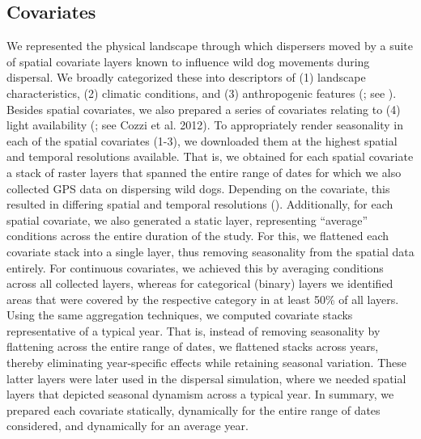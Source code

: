 \documentclass[abstract=on,10pt,a4paper,bibliography=totocnumbered]{article}
\begin{document}
\subsection{Covariates}

We represented the physical landscape through which dispersers moved by a suite
of spatial covariate layers known to influence wild dog movements during
dispersal. We broadly categorized these into descriptors of (1) landscape
characteristics, (2) climatic conditions, and (3) anthropogenic features
(; see \citealp{Hofmann.2021, Hofmann.2023}). Besides
spatial covariates, we also prepared a series of covariates relating to (4)
light availability (; see Cozzi et al. 2012). To
appropriately render seasonality in each of the spatial covariates (1-3), we
downloaded them at the highest spatial and temporal resolutions available. That
is, we obtained for each spatial covariate a stack of raster layers that spanned
the entire range of dates for which we also collected GPS data on dispersing
wild dogs. Depending on the covariate, this resulted in differing spatial and
temporal resolutions (). Additionally, for each spatial
covariate, we also generated a static layer, representing ``average'' conditions
across the entire duration of the study. For this, we flattened each covariate
stack into a single layer, thus removing seasonality from the spatial data
entirely. For continuous covariates, we achieved this by averaging conditions
across all collected layers, whereas for categorical (binary) layers we
identified areas that were covered by the respective category in at least 50\%
of all layers. Using the same aggregation techniques, we computed covariate
stacks representative of a typical year. That is, instead of removing
seasonality by flattening across the entire range of dates, we flattened stacks
across years, thereby eliminating year-specific effects while retaining seasonal
variation. These latter layers were later used in the dispersal simulation,
where we needed spatial layers that depicted seasonal dynamism across a typical
year. In summary, we prepared each covariate statically, dynamically for the
entire range of dates considered, and dynamically for an average year.
\end{document}
